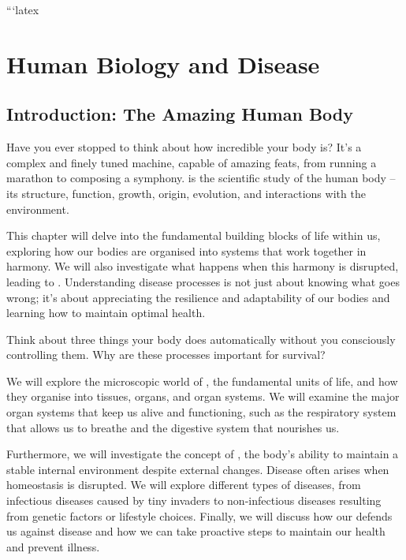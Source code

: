 ```latex
\chapter{Human Biology and Disease}


\section{Introduction: The Amazing Human Body}

Have you ever stopped to think about how incredible your body is? It's a complex and finely tuned machine, capable of amazing feats, from running a marathon to composing a symphony.   is the scientific study of the human body – its structure, function, growth, origin, evolution, and interactions with the environment.

This chapter will delve into the fundamental building blocks of life within us, exploring how our bodies are organised into systems that work together in harmony. We will also investigate what happens when this harmony is disrupted, leading to .  Understanding disease processes is not just about knowing what goes wrong; it's about appreciating the resilience and adaptability of our bodies and learning how to maintain optimal health.

\begin{stopandthink}
Think about three things your body does automatically without you consciously controlling them. Why are these processes important for survival?
\end{stopandthink}

We will explore the microscopic world of , the fundamental units of life, and how they organise into tissues, organs, and organ systems. We will examine the major organ systems that keep us alive and functioning, such as the respiratory system that allows us to breathe and the digestive system that nourishes us.

Furthermore, we will investigate the concept of , the body's ability to maintain a stable internal environment despite external changes. Disease often arises when homeostasis is disrupted. We will explore different types of diseases, from infectious diseases caused by tiny invaders to non-infectious diseases resulting from genetic factors or lifestyle choices. Finally, we will discuss how our  defends us against disease and how we can take proactive steps to maintain our health and prevent illness.


